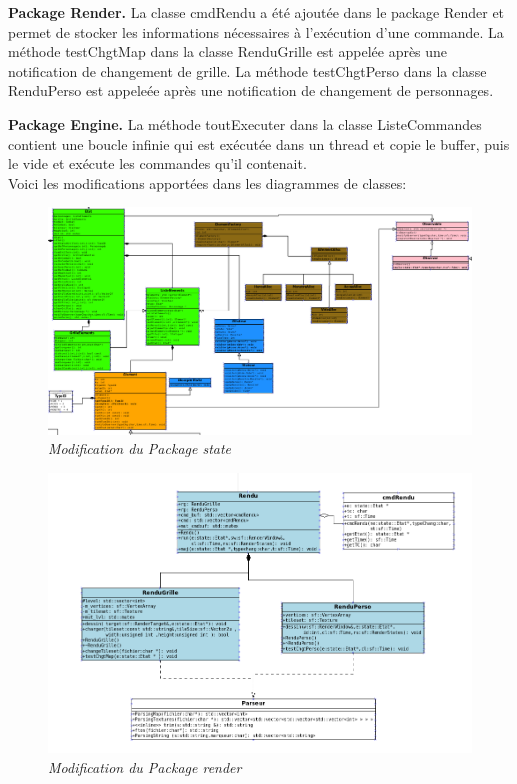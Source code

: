 \documentclass[11pt, a4paper]{article}
\begin{document}
  \textbf{Package Render. } La classe cmdRendu a été ajoutée dans le package Render et permet de stocker les informations nécessaires à l'exécution d'une commande.
  La méthode testChgtMap dans la classe RenduGrille est appelée après une notification de changement de grille.
  La méthode testChgtPerso dans la classe RenduPerso est appeleée après une notification de changement de personnages.
  
  \textbf{Package Engine. } La méthode toutExecuter dans la classe ListeCommandes contient une boucle infinie qui est exécutée dans un thread et copie le buffer, puis le vide et exécute les commandes qu'il contenait.\\
  
  Voici les modifications apportées dans les diagrammes de classes:
  
\begin{figure}[H]
  \centering
  \includegraphics[scale=0.35]{img/state_mod.png}
  \caption{\emph{Modification du Package state}}
\end{figure}
  
\begin{figure}[H]
  \centering
  \includegraphics[scale=0.45]{img/rendu_mod.png}
  \caption{\emph{Modification du Package render}}
\end{figure}
\end{document}

